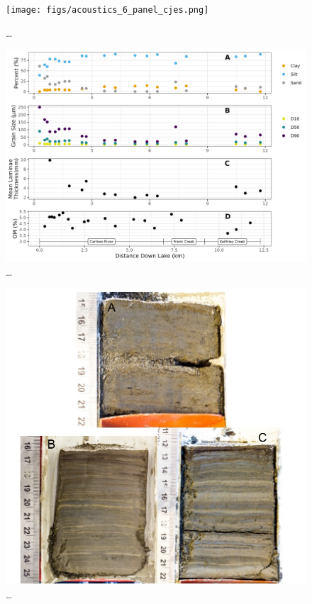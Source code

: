 \documentclass[
  letterpaper,
  DIV=11,
  numbers=noendperiod]{scrartcl}
\begin{document}
\begin{figure}

{\centering \texttt{[image: figs/acoustics\_6\_panel\_cjes.png]}

}

\caption{\label{fig-acoustics}\ldots{}}

\end{figure}

\begin{figure}

{\centering \includegraphics[width=1\textwidth,height=\textheight]{figs/ekman_seds.jpg}

}

\caption{\label{fig-ekmanSeds}\ldots{}}

\end{figure}

\begin{figure}

{\centering \includegraphics[width=1\textwidth,height=\textheight]{figs/ekman_example.jpg}

}

\caption{\label{fig-ekmanImgs}\ldots{}}

\end{figure}
\end{document}
